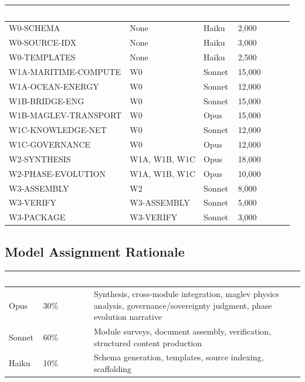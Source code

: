 \documentclass[11pt,letterpaper]{article}
\newcommand{\tableheader}[1]{\textbf{\sffamily\textcolor{white}{#1}}}
\begin{document}
\begin{center}
\begin{tabularx}{\textwidth}{L{3.5cm}L{2.5cm}C{1.5cm}C{2cm}}
\toprule
{}
\tableheader{Component} & \tableheader{Dependencies} & \tableheader{Model} & \tableheader{Est. Tokens} \\
\midrule
W0-SCHEMA & None & Haiku & 2,000 \\
W0-SOURCE-IDX & None & Haiku & 3,000 \\
W0-TEMPLATES & None & Haiku & 2,500 \\
W1A-MARITIME-COMPUTE & W0 & Sonnet & 15,000 \\
W1A-OCEAN-ENERGY & W0 & Sonnet & 12,000 \\
W1B-BRIDGE-ENG & W0 & Sonnet & 15,000 \\
W1B-MAGLEV-TRANSPORT & W0 & Opus & 15,000 \\
W1C-KNOWLEDGE-NET & W0 & Sonnet & 12,000 \\
W1C-GOVERNANCE & W0 & Opus & 12,000 \\
W2-SYNTHESIS & W1A, W1B, W1C & Opus & 18,000 \\
W2-PHASE-EVOLUTION & W1A, W1B, W1C & Opus & 10,000 \\
W3-ASSEMBLY & W2 & Sonnet & 8,000 \\
W3-VERIFY & W3-ASSEMBLY & Sonnet & 5,000 \\
W3-PACKAGE & W3-VERIFY & Sonnet & 3,000 \\
\bottomrule
\end{tabularx}
\end{center}

\subsection{Model Assignment Rationale}

\begin{center}
\begin{tabularx}{\textwidth}{C{1.5cm}C{1.5cm}X}
\toprule
{}
\tableheader{Model} & \tableheader{Allocation} & \tableheader{Rationale} \\
\midrule
Opus & 30\% & Synthesis, cross-module integration, maglev physics analysis, governance/sovereignty judgment, phase evolution narrative \\
Sonnet & 60\% & Module surveys, document assembly, verification, structured content production \\
Haiku & 10\% & Schema generation, templates, source indexing, scaffolding \\
\bottomrule
\end{tabularx}
\end{center}
\end{document}
